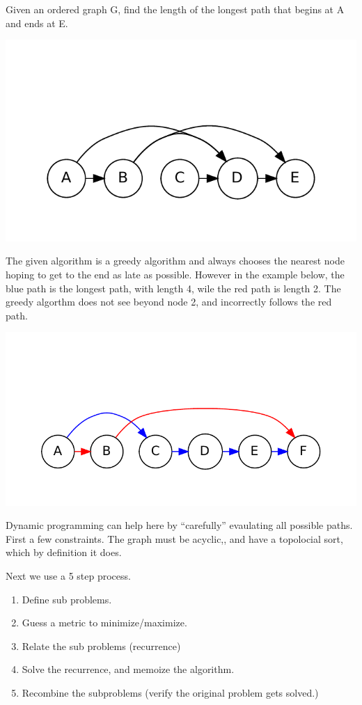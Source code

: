 \documentclass[12pt]{article}
\newenvironment{problem}[2][Problem]{\begin{trivlist}
\item[\hskip \labelsep {\bfseries #1}\hskip \labelsep {\bfseries #2.}]}{\end{trivlist}}
\begin{document}
\begin{problem}{6.3}
    Given an ordered graph G, find the length of the longest path that begins at A and ends at E.

    \includegraphics{6_3a.pdf}

    The given algorithm is a greedy algorithm and always chooses the nearest
    node hoping to get to the end as late as possible. However in the example
    below, the blue path is the longest path, with length 4, wile the red path
    is length 2. The greedy algorthm does not see beyond node 2, and incorrectly
    follows the red path.

    \includegraphics{6_3b.pdf}
    
    Dynamic programming can help here by ``carefully'' evaulating all possible
    paths. First a few constraints. The graph must be acyclic,, and have
    a topolocial sort, which by definition it does. 

    Next we use a 5 step process. 
    \begin{enumerate}
        \item Define sub problems.
        \item Guess a metric to minimize/maximize.
        \item Relate the sub problems (recurrence)
        \item Solve the recurrence, and memoize the algorithm.
        \item Recombine the subproblems (verify the original problem gets
            solved.)
    \end{enumerate}
     

\end{problem}
\end{document}
